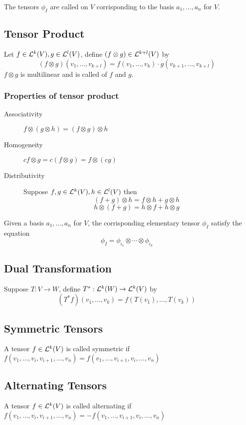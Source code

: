 The tensors $\phi_I$ are called  on $V$ corrisponding to the basis $a_1, \ldots, a_n$ for $V$.

\subsection{Tensor Product}
Let $f\in{\mathcal L}^k(V), g\in{\mathcal L}^l(V)$,
define $(f\otimes g)\in{\mathcal L}^{k+l}(V)$ by
\[(f\otimes g)(v_1,\ldots,v_{k+l})=f(v_1,\ldots,v_k)\cdot g(v_{k+1},\ldots,v_{k+l})\]
$f\otimes g$ is multilinear and is called  of $f$ and $g$.

\subsubsection{Properties of tensor product}
\begin{description}
\item[Associativity] $f\otimes(g\otimes h)=(f\otimes g)\otimes h$
\item[Homogeneity] $cf\otimes g=c(f\otimes g)=f\otimes (cg)$
\item[Distributivity] Suppose $f,g\in {\mathcal L}^k(V), h\in {\mathcal L}^l(V)$ then
	\[(f+g)\otimes h=f\otimes h+g\otimes h\]
	\[h\otimes (f+g)=h\otimes f+h\otimes g\]
\end{description}
Given a basis $a_1,\ldots,a_n$ for $V$, the corrisponding elementary tensor $\phi_I$ satisfy the equation
\[\phi_I=\phi_{i_1}\otimes\cdots\otimes\phi_{i_k}\]

\subsection{Dual Transformation}
Suppose $T:V\to W$, define  $T^*:{\mathcal L}^k(W)\to{\mathcal L}^k(V)$
by \[(T^*f)(v_1,\ldots,v_k)=f(T(v_1),\ldots,T(v_k))\]

\subsection{Symmetric Tensors}
A tensor $f\in{\mathcal L}^k(V)$ is called symmetric if\\
$f(v_1, \ldots, v_i, v_{i+1},\ldots, v_n) = f(v_1, \ldots, v_{i+1}, v_i,\ldots, v_n)$

\subsection{Alternating Tensors}
A tensor $f\in{\mathcal L}^k(V)$ is called alternating if\\
$f(v_1, \ldots, v_i, v_{i+1},\ldots, v_n) = -f(v_1, \ldots, v_{i+1}, v_i,\ldots, v_n)$

